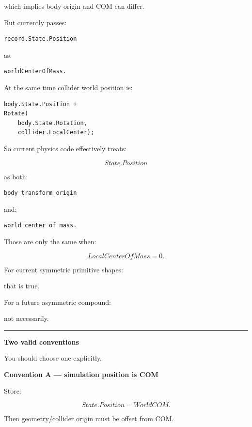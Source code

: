 which implies body origin and COM can differ.

But  currently passes:

\begin{verbatim}
record.State.Position
\end{verbatim}

as:

\begin{verbatim}
worldCenterOfMass.
\end{verbatim}

At the same time collider world position is:

\begin{verbatim}
body.State.Position +
Rotate(
    body.State.Rotation,
    collider.LocalCenter);
\end{verbatim}

So current physics code effectively treats:

\[
State.Position
\]

as both:

\begin{verbatim}
body transform origin
\end{verbatim}

and:

\begin{verbatim}
world center of mass.
\end{verbatim}

Those are only the same when:

\[
LocalCenterOfMass=0.
\]

For current symmetric primitive shapes:

that is true.

For a future asymmetric compound:

not necessarily.

\begin{center}\rule{0.5\linewidth}{0.5pt}\end{center}

\textbf{Two valid conventions}

You should choose one explicitly.

\textbf{Convention A --- simulation position is COM}

Store:

\[
State.Position
=
WorldCOM.
\]

Then geometry/collider origin must be offset from COM.

